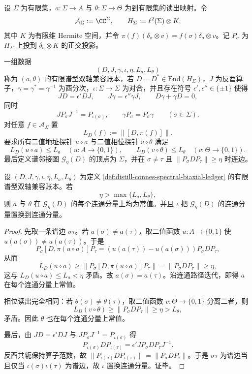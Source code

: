\begin{definition}[有限谱型双轴兼容账本]\label{def:distill-connes-spectral-biaxial-ledger}
设 \(\Sigma\) 为有限集，\(a:\Sigma\to A\) 与 \(\theta:\Sigma\to \Theta\) 为到有限集的读出映射。令
\[
\mathcal A_{\Sigma}:=\CC^{\Sigma},\qquad
H_{\Sigma}:=\ell^2(\Sigma)\otimes K,
\]
其中 \(K\) 为有限维 Hermite 空间，并令 \(\pi(f)(\delta_{\sigma}\otimes v)=f(\sigma)\delta_{\sigma}\otimes v\)。记 \(P_{\sigma}\) 为 \(H_{\Sigma}\) 上投到 \(\delta_{\sigma}\otimes K\) 的正交投影。

一组数据
\[
(D,J,\gamma,\iota,\eta,L_a,L_{\theta})
\]
称为 \((a,\theta)\) 的有限谱型双轴兼容账本，若 \(D=D^*\in\mathrm{End}(H_{\Sigma})\)，\(J\) 为反酉算子，\(\gamma=\gamma^*=\gamma^{-1}\) 为酉分次，\(\iota:\Sigma\to\Sigma\) 为对合，并且存在符号 \(\epsilon',\epsilon''\in\{\pm1\}\) 使得
\[
JD=\epsilon'DJ,\qquad J\gamma=\epsilon''\gamma J,\qquad D\gamma+\gamma D=0,
\]
同时
\[
JP_{\sigma}J^{-1}=P_{\iota(\sigma)},\qquad \gamma P_{\sigma}=P_{\sigma}\gamma\qquad(\sigma\in\Sigma).
\]
对任意 \(f\in\mathcal A_{\Sigma}\) 置
\[
L_D(f):=\|[D,\pi(f)]\|.
\]
要求所有二值地址探针 \(u\circ a\) 与二值相位探针 \(v\circ\theta\) 满足
\[
L_D(u\circ a)\le L_a\quad(u:A\to\{0,1\}),\qquad
L_D(v\circ\theta)\le L_{\theta}\quad(v:\Theta\to\{0,1\}).
\]
最后定义谱邻接图 \(\mathcal G_{\eta}(D)\) 的顶点为 \(\Sigma\)，并在 \(\sigma\ne\tau\) 且 \(\|P_{\sigma}DP_{\tau}\|\ge\eta\) 时连边。
\end{definition}

\begin{proposition}[有界交换子给出的双轴纤维刚性]\label{prop:distill-connes-typed-biaxial-fibre-rigidity}
设 \((D,J,\gamma,\iota,\eta,L_a,L_{\theta})\) 为定义 \ref{def:distill-connes-spectral-biaxial-ledger} 的有限谱型双轴兼容账本。若
\[
\eta>\max\{L_a,L_{\theta}\},
\]
则 \(a\) 与 \(\theta\) 在 \(\mathcal G_{\eta}(D)\) 的每个连通分量上均为常值。并且 \(\iota\) 把 \(\mathcal G_{\eta}(D)\) 的连通分量置换到连通分量。
\end{proposition}
\begin{proof}
先取一条谱边 \(\sigma\tau\)。若 \(a(\sigma)\ne a(\tau)\)，取二值函数 \(u:A\to\{0,1\}\) 使 \(u(a(\sigma))\ne u(a(\tau))\)。于是
\[
P_{\sigma}[D,\pi(u\circ a)]P_{\tau}
=(u(a(\tau))-u(a(\sigma)))P_{\sigma}DP_{\tau},
\]
从而
\[
L_D(u\circ a)\ge \|P_{\sigma}[D,\pi(u\circ a)]P_{\tau}\|=\|P_{\sigma}DP_{\tau}\|\ge\eta,
\]
这与 \(L_D(u\circ a)\le L_a<\eta\) 矛盾。故 \(a(\sigma)=a(\tau)\)。沿连通路径迭代，即得 \(a\) 在每个连通分量上常值。

相位读出完全相同：若 \(\theta(\sigma)\ne\theta(\tau)\)，取二值函数 \(v:\Theta\to\{0,1\}\) 分离二者，则
\[
L_D(v\circ\theta)\ge\|P_{\sigma}DP_{\tau}\|\ge\eta>L_{\theta},
\]
矛盾。因此 \(\theta\) 也在每个连通分量上常值。

最后，由 \(JD=\epsilon'DJ\) 与 \(JP_{\sigma}J^{-1}=P_{\iota(\sigma)}\) 得
\[
P_{\iota(\sigma)}DP_{\iota(\tau)}
=\epsilon' J P_{\sigma}DP_{\tau}J^{-1}.
\]
反酉共轭保持算子范数，故 \(\|P_{\iota(\sigma)}DP_{\iota(\tau)}\|=\|P_{\sigma}DP_{\tau}\|\)。于是 \(\sigma\tau\) 为谱边当且仅当 \(\iota(\sigma)\iota(\tau)\) 为谱边，故 \(\iota\) 置换连通分量。证毕。
\end{proof}

